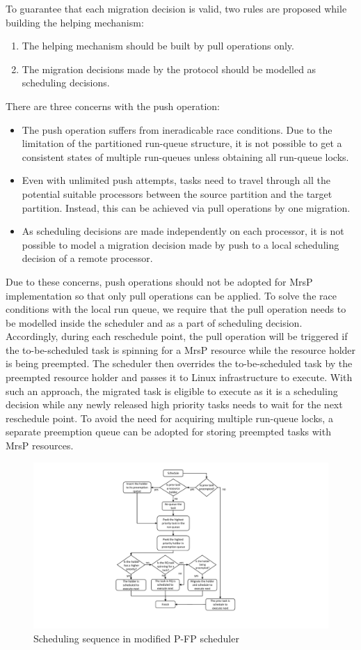 \documentclass{report}
\begin{document}
To guarantee that each migration decision is valid, two rules are proposed while building the helping mechanism:
\begin{enumerate}
\renewcommand{\labelenumi}{(\theenumi)}
\item The helping mechanism should be built by pull operations only.
\item The migration decisions made by the protocol should be modelled as scheduling decisions.
\end{enumerate}
There are three concerns with the push operation:
\begin{itemize}
\item The push operation suffers from ineradicable race conditions. Due to the limitation of the partitioned run-queue structure, it is not possible to get a consistent states of multiple run-queues unless obtaining all run-queue locks.
\item Even with unlimited push attempts, tasks need to travel through all the potential suitable processors between the source partition and the target partition. Instead, this can be achieved via pull operations by one migration.
\item As scheduling decisions are made independently on each processor, it is not possible to model a migration decision made by push to a local scheduling decision of a remote processor.
\end{itemize}
Due to these concerns, push operations should not be adopted for MrsP implementation so that only pull operations can be applied. To solve the race conditions with the local run queue, we require that the pull operation needs to be modelled inside the scheduler and as a part of scheduling decision. Accordingly, during each reschedule point, the pull operation will be triggered if the to-be-scheduled task is spinning for a MrsP resource while the resource holder is being preempted. The scheduler then overrides the to-be-scheduled task by the preempted resource holder and passes it to Linux infrastructure to execute. With such an approach, the migrated task is eligible to execute as it is a scheduling decision while any newly released high priority tasks needs to wait for the next reschedule point. To avoid the need for acquiring multiple run-queue locks, a separate preemption queue can be adopted for storing preempted tasks with MrsP resources.

\begin{figure}[!h]
\centering
\includegraphics[width=.7\columnwidth]{graphics/pfp.pdf}
\caption{Scheduling sequence in modified P-FP scheduler}
\label{schedulingroutinepfp}
\end{figure}
\end{document}
